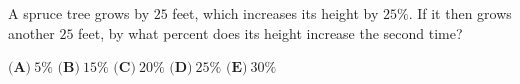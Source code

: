 A spruce tree grows by $25$ feet, which increases its height by $25\%$. If it then grows another $25$ feet, by what percent does its height increase the second time?

$\textbf{(A)}\ $$5\%$ \qquad $\textbf{(B)}\ $$15\%$ \qquad $\textbf{(C)}\ $$20\%$ \qquad $\textbf{(D)}\ $$25\%$ \qquad $\textbf{(E)}\ $$30\%$
